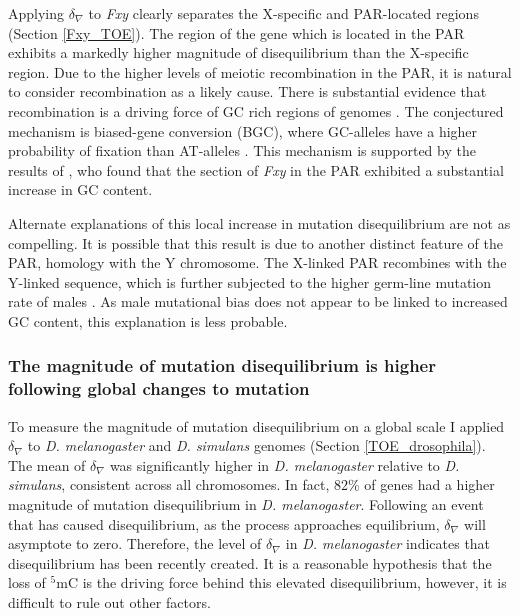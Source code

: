 Applying $\delta_\nabla$ to \textit{Fxy} clearly separates the X-specific and PAR-located regions (Section \ref{Fxy_TOE}). The region of the gene which is located in the PAR exhibits a markedly higher magnitude of disequilibrium than the X-specific region. Due to the higher levels of meiotic recombination in the PAR, it is natural to consider recombination as a likely cause. There is substantial evidence that recombination is a driving force of GC rich regions of genomes \citep{Meunier2004RecombinationGenome, Berglund2009HotspotsGenes,Galtier2009GC-biasedPrimates}. The conjectured mechanism is biased-gene conversion (BGC), where GC-alleles have a higher probability of fixation than AT-alleles \citep{Eyre-Walker1999EvidenceDNA., Mancera2008High-resolutionYeast}. This mechanism is supported by the results of \cite{Montoya-Burgos2003RecombinationGenomes}, who found that the section of \textit{Fxy} in the PAR exhibited a substantial increase in GC content. 

Alternate explanations of this local increase in mutation disequilibrium are not as compelling. It is possible that this result is due to another distinct feature of the PAR, homology with the Y chromosome. The X-linked PAR recombines with the Y-linked sequence, which is further subjected to the higher germ-line mutation rate of males \citep{Huttley2000HowMutagenesis}. As male mutational bias does not appear to be linked to increased GC content, this explanation is less probable. 

\subsubsection{The magnitude of mutation disequilibrium is higher following global changes to mutation}

To measure the magnitude of mutation disequilibrium on a global scale I applied $\delta_\nabla$ to \textit{D. melanogaster} and \textit{D. simulans} genomes (Section \ref{TOE_drosophila}). The mean of $\delta_\nabla$ was significantly higher in \textit{D. melanogaster} relative to \textit{D. simulans}, consistent across all chromosomes. In fact, $82$\% of genes had a higher magnitude of mutation disequilibrium in \textit{D. melanogaster}. Following an event that has caused disequilibrium, as the process approaches equilibrium, $\delta_\nabla$ will asymptote to zero. Therefore, the level of $\delta_\nabla$ in \textit{D. melanogaster} indicates that disequilibrium has been recently created. It is a reasonable hypothesis that the loss of $^5$mC is the driving force behind this elevated disequilibrium, however, it is difficult to rule out other factors. 


